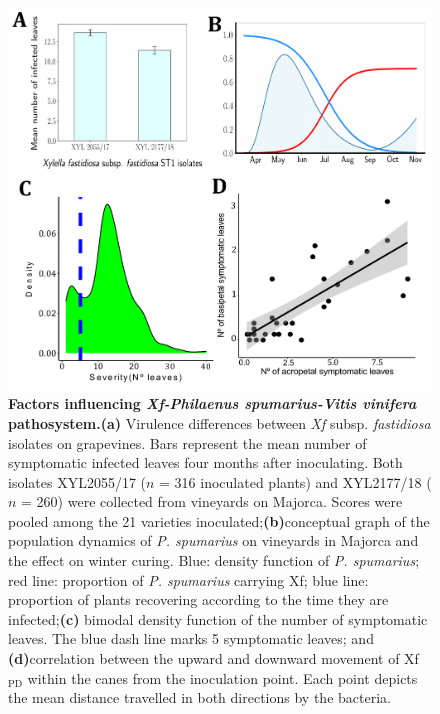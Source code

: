 \begin{figure}[H]
    \centering
    \includegraphics[width=\textwidth]{Figures/Fig S1.pdf}
    \caption[Factors influencing \textit {Xf-Philaenus
            spumarius-Vitis vinifera} pathosystem]{\textbf{Factors influencing
            \textit
            {Xf-Philaenus
                spumarius-Vitis vinifera} pathosystem.}\textbf{(a)} Virulence
        differences
        between \textit{Xf} subsp. \textit{fastidiosa} isolates on grapevines.
        Bars
        represent the mean number of symptomatic infected leaves four months
        after
        inoculating. Both isolates XYL2055/17 ($n$ = 316 inoculated plants) and
        XYL2177/18 ($n$ = 260) were collected from vineyards on Majorca. Scores
        were
        pooled among the 21 varieties inoculated;\textbf{(b)}conceptual graph
        of the
        population dynamics of \textit{P. spumarius} on vineyards in Majorca
        and the
        effect on winter curing. Blue: density function of \textit{P.
            spumarius}; red
        line: proportion of \textit{P. spumarius} carrying Xf; blue line:
        proportion of
        plants recovering according to the time they are infected;\textbf{(c)}
        bimodal
        density function of the number of symptomatic leaves. The blue dash
        line marks
        5 symptomatic leaves; and \textbf{(d)}correlation between the upward
        and
        downward movement of Xf$_{\textrm{PD}}$ within the canes from the
        inoculation
        point. Each point depicts the mean distance travelled in both
        directions by the
        bacteria.
        \label{figS1}} %
\end{figure}

